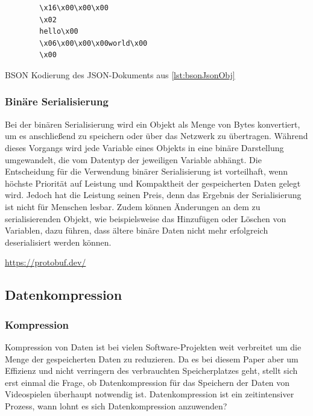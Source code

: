 \begin{listing}[htp]
    \begin{verbatim} 
        \x16\x00\x00\x00           
        \x02                      
        hello\x00                  
        \x06\x00\x00\x00world\x00  
        \x00                       
    \end{verbatim}
    \caption{BSON Kodierung des JSON-Dokuments aus \ref{lst:bsonJsonObj} \cite{mongodbJSONBSON}}
    \label{lst:bsonExp}
\end{listing}

\subsubsection{Binäre Serialisierung}
Bei der binären Serialisierung wird ein Objekt als Menge von Bytes konvertiert, um es anschließend zu speichern oder über das Netzwerk zu übertragen. Während dieses Vorgangs wird jede Variable eines Objekts in eine binäre Darstellung umgewandelt, die vom Datentyp der jeweiligen Variable abhängt. Die Entscheidung für die Verwendung binärer Serialisierung ist vorteilhaft, wenn höchste Priorität auf Leistung und Kompaktheit der gespeicherten Daten gelegt wird. Jedoch hat die Leistung seinen Preis, denn das Ergebnis der Serialisierung ist nicht für Menschen lesbar. Zudem können Änderungen an dem zu serialisierenden Objekt, wie beispielsweise das Hinzufügen oder Löschen von Variablen, dazu führen, dass ältere binäre Daten nicht mehr erfolgreich deserialisiert werden können.
\cite{microsoftBinarySerialization}\cite{programmathicallyUnderstandingBinary}

\url{https://protobuf.dev/}


\subsection{Datenkompression}
\subsubsection{Kompression}
Kompression von Daten ist bei vielen Software-Projekten weit verbreitet um die Menge der gespeicherten Daten zu reduzieren. Da es bei diesem Paper aber um Effizienz und nicht verringern des verbrauchten Speicherplatzes geht, stellt sich erst einmal die Frage, ob Datenkompression für das Speichern der Daten von Videospielen überhaupt notwendig ist. Datenkompression ist ein zeitintensiver Prozess, wann lohnt es sich Datenkompression anzuwenden? 

